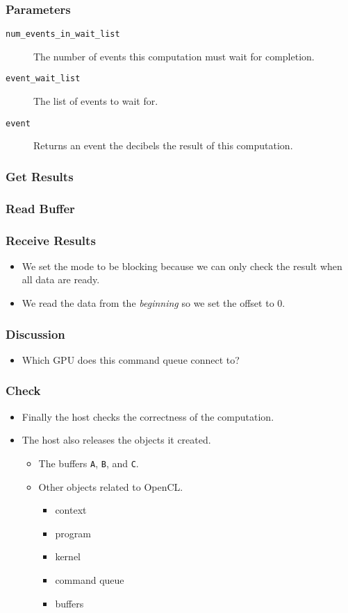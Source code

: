\documentclass{beamer}
\begin{document}
\begin{frame}
  \frametitle{Parameters}
  \begin{description}
  \item [\tt num\_events\_in\_wait\_list] The number of events this
    computation must wait for completion.
  \item [\tt event\_wait\_list] The list of events to wait for.
  \item [\tt event] Returns an event the decibels the result of this
    computation.
  \end{description}
\end{frame}

\begin{frame}
  \frametitle{Get Results}
\end{frame}

\begin{frame}
  \frametitle{Read Buffer}
  \centerline{}
\end{frame}


\begin{frame}
  \frametitle{Receive Results}
  \begin{itemize}
  \item We set the mode to be blocking because we can only check the
    result when all data are ready.
  \item We read the data from the {\em beginning} so we set the offset to 0.
  \end{itemize}
\end{frame}

\begin{frame}
  \frametitle{Discussion}
  \begin{itemize}
    \item Which GPU does this command queue connect to?
  \end{itemize}
\end{frame}

\begin{frame}
  \frametitle{Check}
  \begin{itemize}
  \item Finally the host checks the correctness of the computation.
  \item The host also releases the objects it created.
    \begin{itemize}
      \item The buffers {\tt A}, {\tt B}, and {\tt C}.
      \item Other objects related to OpenCL.
        \begin{itemize}
        \item context
        \item program
        \item kernel
        \item command queue
        \item buffers
        \end{itemize}
    \end{itemize}
  \end{itemize}
\end{frame}
\end{document}

